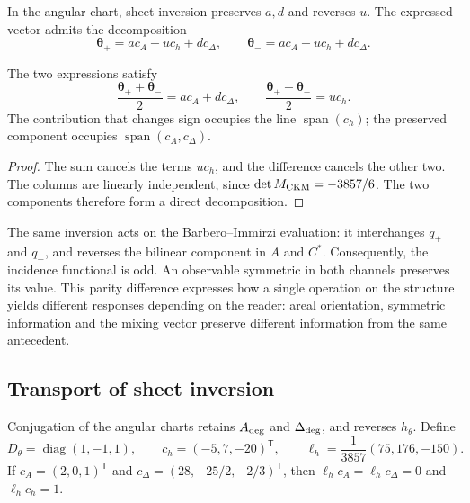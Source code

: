 In the angular chart, sheet inversion preserves \(a,d\) and reverses \(u\). The expressed vector admits the decomposition
\[
 \boldsymbol\theta_+=a c_A+u c_h+d c_\Delta,
 \qquad
 \boldsymbol\theta_-=a c_A-u c_h+d c_\Delta.
\]
\begin{proposition}
\label{ii:prop:ii09-paridad-angular}
The two expressions satisfy
\[
 \frac{\boldsymbol\theta_++\boldsymbol\theta_-}{2}
       =a c_A+d c_\Delta,\qquad
 \frac{\boldsymbol\theta_+-\boldsymbol\theta_-}{2}=u c_h.
\]
The contribution that changes sign occupies the line
\(\operatorname{span}(c_h)\); the preserved component occupies
\(\operatorname{span}(c_A,c_\Delta)\).
\end{proposition}
\begin{proof}
The sum cancels the terms \(u c_h\), and the difference cancels
the other two. The columns are linearly independent, since
\(\det\mathsf M_{\rm CKM}=-3857/6\). The two components therefore
form a direct decomposition.
\end{proof}

The same inversion acts on the Barbero--Immirzi evaluation: it interchanges \(q_+\) and \(q_-\), and reverses the bilinear component in \(A\) and \(C^*\). Consequently, the incidence functional is odd. An observable symmetric in both channels preserves its value. This parity difference expresses how a single operation on the structure yields different responses depending on the reader: areal orientation, symmetric information and the mixing vector preserve different information from the same antecedent.



\subsection{Transport of sheet inversion}

Conjugation of the angular charts retains \(A_{\rm deg}\) and \(\Delta_{\rm deg}\), and reverses \(h_\theta\). Define
\begin{equation}
 D_\theta=\operatorname{diag}(1,-1,1),\qquad
 c_h=(-5,7,-20)^{\mathsf T},\qquad
 \ell_h=\frac1{3857}(75,176,-150).
 \label{ii:eq:ii-ckm-sheet-data}
\end{equation}
If \(c_A=(2,0,1)^{\mathsf T}\) and \(c_\Delta=(28,-25/2,-2/3)^{\mathsf T}\), then \(\ell_hc_A=\ell_hc_\Delta=0\) and \(\ell_hc_h=1\).

